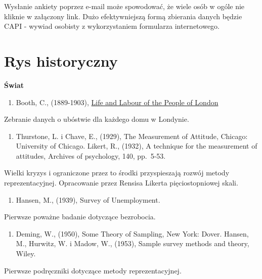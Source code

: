 \documentclass[
]{book}
\providecommand{\tightlist}{%
  \setlength{\itemsep}{0pt}\setlength{\parskip}{0pt}}
\begin{document}
Wysłanie ankiety poprzez e-mail może spowodować, że wiele osób w ogóle nie kliknie w załączony link. Dużo efektywniejszą formą zbierania danych będzie CAPI - wywiad osobisty z wykorzystaniem formularza internetowego.

\hypertarget{rys-historyczny}{%
\section{Rys historyczny}\label{rys-historyczny}}

\textbf{Świat}

\begin{enumerate}
\def\labelenumi{\arabic{enumi}.}
\tightlist
\item
  Booth, C., (1889-1903), \href{https://booth.lse.ac.uk/}{Life and Labour of the People of London}
\end{enumerate}

Zebranie danych o ubóstwie dla każdego domu w Londynie.

\begin{enumerate}
\def\labelenumi{\arabic{enumi}.}
\setcounter{enumi}{1}
\tightlist
\item
  Thurstone, L. i Chave, E., (1929), The Measurement of Attitude, Chicago: University of Chicago.
  Likert, R., (1932), A technique for the measurement of attitudes, Archives of psychology, 140, pp.~5-53.
\end{enumerate}

Wielki kryzys i ograniczone przez to środki przyspieszają rozwój metody reprezentacyjnej. Opracowanie przez Rensisa Likerta pięciostopniowej skali.

\begin{enumerate}
\def\labelenumi{\arabic{enumi}.}
\setcounter{enumi}{2}
\tightlist
\item
  Hansen, M., (1939), Survey of Unemployment.
\end{enumerate}

Pierwsze poważne badanie dotyczące bezrobocia.

\begin{enumerate}
\def\labelenumi{\arabic{enumi}.}
\setcounter{enumi}{3}
\tightlist
\item
  Deming, W., (1950), Some Theory of Sampling, New York: Dover.
  Hansen, M., Hurwitz, W. i Madow, W., (1953), Sample survey methods and theory, Wiley.
\end{enumerate}

Pierwsze podręczniki dotyczące metody reprezentacyjnej.
\end{document}
